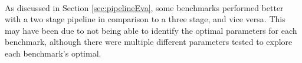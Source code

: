\paragraph{}
As discussed in Section \ref{sec:pipelineEva}, some benchmarks performed better with a two stage pipeline in comparison to a three stage, and vice versa. This may have been due to not being able to identify the optimal parameters for each benchmark, although there were multiple different parameters tested to explore each benchmark's optimal. 